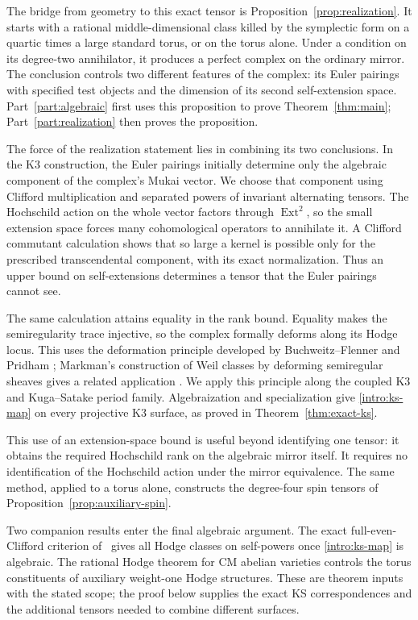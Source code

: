 \documentclass[11pt]{article}
\numberwithin{equation}{section}
\theoremstyle{definition}
\theoremstyle{remark}
\DeclareMathOperator{\Ext}{Ext}
\begin{document}
The bridge from geometry to this exact tensor is
Proposition~\ref{prop:realization}.  It starts with a rational
middle-dimensional class killed by the symplectic form on a quartic
times a large standard torus, or on the torus alone.  Under a condition
on its degree-two annihilator, it produces a perfect complex on the
ordinary mirror.
The conclusion controls two different features of the complex:
its Euler pairings with specified test objects and the dimension of
its second self-extension space.  Part~\ref{part:algebraic} first
uses this proposition to prove Theorem~\ref{thm:main};
Part~\ref{part:realization} then proves the proposition.

The force of the realization statement lies in combining its two
conclusions.  In the K3 construction, the Euler pairings initially
determine only the algebraic component of the complex's Mukai vector.
We choose that component
using Clifford multiplication and separated powers of invariant
alternating tensors.  The Hochschild action on the whole vector
factors through \(\Ext^2\), so the small extension space forces
many cohomological operators to annihilate it.  A Clifford commutant
calculation shows that so large a kernel is possible only for the
prescribed transcendental component, with its exact normalization.
Thus an upper bound on self-extensions determines a tensor that the
Euler pairings cannot see.

The same calculation attains equality in the rank bound.  Equality
makes the semiregularity trace injective, so the complex formally
deforms along its Hodge locus.  This uses the deformation
principle developed by
Buchweitz--Flenner and Pridham
\cite{BuchweitzFlennerSemiregularity,PridhamSemiregularity};
Markman's construction of Weil classes by deforming semiregular
sheaves gives a related application
\cite[Sections~7--9]{MarkmanSecant}.  We apply this principle along
the coupled K3 and Kuga--Satake period family.  Algebraization and
specialization give \eqref{intro:ks-map} on every projective K3
surface, as proved in
Theorem~\ref{thm:exact-ks}.

This use of an extension-space bound is useful beyond identifying
one tensor: it obtains the required Hochschild rank on the algebraic
mirror itself.  It requires no identification of the Hochschild
action under the mirror equivalence.  The same method, applied to a
torus alone, constructs the degree-four spin tensors of
Proposition~\ref{prop:auxiliary-spin}.

Two companion results enter the final algebraic argument.  The exact
full-even-Clifford criterion of~\cite[Theorem~1.1]{AKS} gives all
Hodge classes on self-powers once \eqref{intro:ks-map} is algebraic.
The rational Hodge theorem for CM abelian varieties
\cite[Theorem~1.1]{CM} controls the torus constituents of auxiliary
weight-one Hodge structures.  These are theorem inputs with the stated
scope; the proof below supplies the exact KS correspondences and the
additional tensors needed to combine different surfaces.
\end{document}
